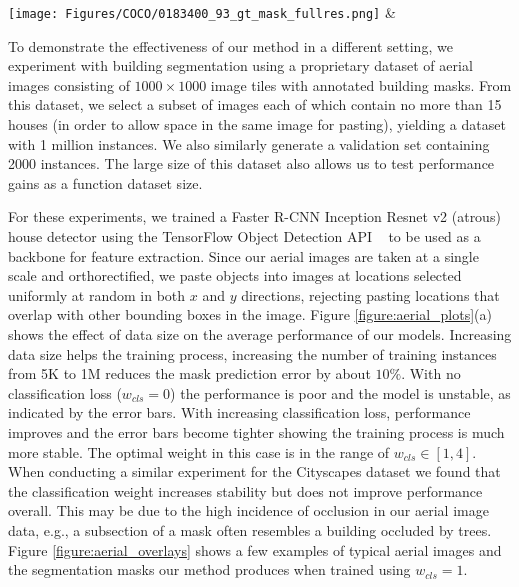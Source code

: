 \documentclass[runningheads]{llncs}
\begin{document}
\texttt{[image: Figures/COCO/0183400\_93\_gt\_mask\_fullres.png]} &%

To demonstrate the effectiveness of our method in a different setting, we experiment with building segmentation using
a proprietary dataset of aerial images
consisting of $1000\!\times\!1000$ image tiles with annotated building masks. From this dataset, we select a subset of images each of which
contain no
more than 15 houses (in order to allow space in the same image for
pasting), yielding a dataset with 1 million instances.  We also 
similarly generate a validation set containing 
2000 instances. The large size of this dataset also allows us to test performance gains as a function dataset size.   

For these experiments, we trained a Faster R-CNN Inception Resnet v2
(atrous) house detector using the TensorFlow Object Detection API
~\cite{huang2016speed} 
to be used as a backbone for feature extraction.
Since our aerial images are taken at a single scale and
orthorectified, we paste objects into images at locations selected uniformly at random in 
both $x$ and $y$ directions, rejecting pasting locations that 
overlap with other bounding boxes in the image.
Figure \ref{figure:aerial_plots}(a) shows the effect of data size on the average performance of our models. 
Increasing data size helps the training process, increasing the number of training instances from 5K to 1M reduces the mask prediction error by about $10\%$. 
With no classification loss ($w_{cls}=0$) the performance is poor and the model is unstable, as indicated by the error bars. With increasing classification loss, performance improves and the error bars become tighter showing the training process is much more stable. The optimal weight in this case is in the range of $w_{cls}\in[1,4]$.  When conducting a similar experiment for the Cityscapes dataset we found that the classification weight increases stability but does not improve performance overall.
This may be due to the high incidence of occlusion in our aerial image data, e.g., a subsection of a mask often resembles a building occluded by trees. Figure \ref{figure:aerial_overlays} shows a few examples of typical aerial images and the segmentation masks our method produces when trained using $w_{cls}=1$. 
\end{document}
